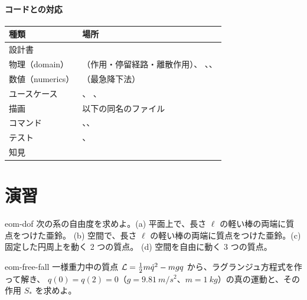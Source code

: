 \paragraph{コードとの対応}
\begin{center}
\begin{tabularx}{\linewidth}{@{}lL@{}}
\toprule
種類 & 場所 \\
\midrule
設計書 &  \\
物理（domain） & （作用・停留経路・離散作用）、
  、、 \\
数値（numerics） & （最急降下法） \\
ユースケース & 、
  、 \\
描画 &  以下の同名のファイル \\
コマンド & 、、 \\
テスト & 、 \\
知見 &  \\
\bottomrule
\end{tabularx}
\end{center}

\section{演習}\label{sec:eom-exercises}

\begin{exercise}[基礎]{eom-dof}
次の系の自由度を求めよ。(a) 平面上で、長さ $\ell$ の軽い棒の両端に質点をつけた亜鈴。
(b) 空間で、長さ $\ell$ の軽い棒の両端に質点をつけた亜鈴。(c) 固定した円周上を動く 2 つの質点。
(d) 空間を自由に動く 3 つの質点。
\end{exercise}

\begin{exercise}[基礎]{eom-free-fall}
一様重力中の質点 $\mathcal{L}=\tfrac12m\dot q^2-mgq$ から、ラグランジュ方程式を作って解き、
$q(0)=q(2)=0$（$g=\qty{9.81}{m/s^2}$、$m=\qty{1}{kg}$）の真の運動と、その作用 $S_*$ を求めよ。
\end{exercise}

